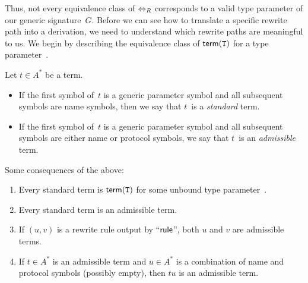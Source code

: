 \documentclass[../generics]{subfiles}
\begin{document}
Thus, not every equivalence class of $\Leftrightarrow_R$ corresponds to a valid type parameter of our generic signature~$G$. Before we can see how to translate a specific rewrite path into a derivation, we need to understand which rewrite paths are meaningful to us. We begin by describing the equivalence class of $\mathsf{term}(\texttt{T})$ for a type parameter~\tT.

\begin{definition}
Let $t\in A^*$ be a term.
\begin{itemize}
\item If the first symbol of~$t$ is a generic parameter symbol and all subsequent symbols are name symbols, then we say that $t$~is a \emph{standard} term.

\item If the first symbol of~$t$ is a generic parameter symbol and all subsequent symbols are either name or protocol symbols, we say that $t$~is an \emph{admissible} term.
\end{itemize}
\end{definition}

\begin{lemma}
Some consequences of the above:
\begin{enumerate}
\item Every standard term is $\mathsf{term}(\texttt{T})$ for some unbound type parameter~\tT.
\item Every standard term is an admissible term.
\item If $(u,v)$ is a rewrite rule output by ``$\mathsf{rule}$'', both $u$ and $v$ are admissible terms.
\item If $t\in A^*$ is an admissible term and $u\in A^*$ is a combination of name and protocol symbols (possibly empty), then $tu$ is an admissible term.
\end{enumerate}
\end{lemma}
\end{document}
